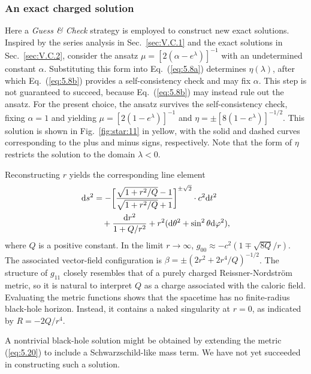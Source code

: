 \documentclass[aps,prd,twocolumn]{revtex4-2}
\newcommand\dx{{\rm d}}
\begin{document}
\subsubsection{An exact charged solution}\label{sec:V.C.3}
Here a \textit{Guess \& Check} strategy is employed to construct new exact solutions. Inspired by the series analysis in Sec.~\ref{sec:V.C.1} and the exact solutions in Sec.~\ref{sec:V.C.2}, consider the ansatz $\mu=[2(\alpha-e^\lambda)]^{-1}$ with an undetermined constant $\alpha$. Substituting this form into Eq.~(\ref{eq:5.8a}) determines $\eta(\lambda)$, after which Eq.~(\ref{eq:5.8b}) provides a self-consistency check and may fix $\alpha$. This step is not guaranteed to succeed, because Eq.~(\ref{eq:5.8b}) may instead rule out the ansatz. For the present choice, the ansatz survives the self-consistency check, fixing $\alpha=1$ and yielding $\mu=[2(1-e^\lambda)]^{-1}$ and $\eta=\pm[8(1-e^\lambda)]^{-1/2}$. This solution is shown in Fig.~\ref{fig:star:11} in yellow, with the solid and dashed curves corresponding to the plus and minus signs, respectively. Note that the form of $\eta$ restricts the solution to the domain $\lambda<0$.

Reconstructing $r$ yields the corresponding line element
\begin{align}\label{eq:5.20}
  \dx s^2 &= - \bigg[\frac{\sqrt{1+r^2/Q}-1}{\sqrt{1+r^2/Q}+1}\bigg]^{\pm\sqrt{2}} \cdot c^2\dx t^2 \nonumber\\
    &\quad + \frac{\dx r^2}{1+Q/r^2} + r^2(\dx\theta^2+\sin^2\theta\dx\varphi^2),
\end{align}
where $Q$ is a positive constant. In the limit $r\rightarrow\infty$, $g_{00}\approx-c^2(1\mp\sqrt{8Q}/r)$. The associated vector-field configuration is $\beta=\pm(2r^2+2r^4/Q)^{-1/2}$. The structure of $g_{11}$ closely resembles that of a purely charged Reissner-Nordstr{\"o}m metric, so it is natural to interpret $Q$ as a charge associated with the caloric field. Evaluating the metric functions shows that the spacetime has no finite-radius black-hole horizon. Instead, it contains a naked singularity at $r=0$, as indicated by $R=-2Q/r^4$.

A nontrivial black-hole solution might be obtained by extending the metric (\ref{eq:5.20}) to include a Schwarzschild-like mass term. We have not yet succeeded in constructing such a solution.
\end{document}
